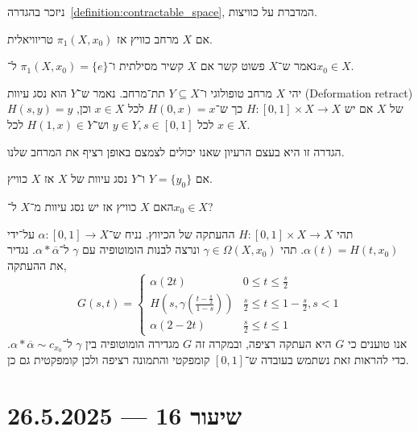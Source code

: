 ניזכר בהגדרה\ \ref{definition:contractable_space}, המדברת על כוויצות.
\begin{remark}
	אם $X$ מרחב כוויץ אז $\pi_1(X, x_0)$ טריוויאלית.
\end{remark}
\begin{definition}
	נאמר ש־$X$ פשוט קשר אם $X$ קשיר מסילתית ו־$\pi_1(X, x_0) = \{ e \}$ ל־$x_0 \in X$.
\end{definition}
\begin{definition}
	יהי $X$ מרחב טופולוגי ו־$Y \subseteq X$ תת־מרחב.
	נאמר ש־$Y$ הוא נסג עיוות (Deformation retract) של $X$ אם יש $H : [0, 1] \times X \to X$ כך ש־$H(0, x) = x$ לכל $x \in X$ וכן,
	$H(s, y) = y$ לכל $y \in Y, s \in [0, 1]$ וש־$H(1, x) \in Y$ לכל $x \in X$.
\end{definition}
הגדרה זו היא בעצם הרעיון שאנו יכולים לצמצם באופן רציף את המרחב שלנו.
\begin{example}
	אם $Y = \{ y_0 \}$ ו־$Y$ נסג עיוות של $X$ אז $X$ כוויץ.
\end{example}
\begin{exercise}
	האם $X$ כוויץ אז יש נסג עיוות מ־$X$ ל־$x_0 \in X$?
\end{exercise}
\begin{solution}
	תהי $H : [0, 1] \times X \to X$ ההעתקה של הכיווץ.
	נניח ש־$\alpha : [0, 1] \to X$ על־ידי $\alpha(t) = H(t, x_0)$.
	תהי $\gamma \in \Omega(X, x_0)$ ונרצה לבנות הומוטופיה עם $\gamma$ ל־$\alpha * \overline{\alpha}$.
	נגדיר את ההעתקה,
	\[
		G(s, t)
		= \begin{cases}
			\alpha(2t) & 0 \le t \le \frac{s}{2} \\
			H(s, \gamma(\frac{t - \frac{s}{2}}{1 - s})) & \frac{s}{2} \le t \le 1 - \frac{s}{2}, s < 1 \\
			\alpha(2 - 2t) & \frac{s}{2} \le t \le 1
		\end{cases}
	\]
	אנו טוענים כי $G$ היא העתקה רציפה, ובמקרה זה $G$ מגדירה הומוטופיה בין $\gamma$ ל־$\alpha * \overline{\alpha} \sim c_{x_0}$.
	כדי להראות זאת נשתמש בעובדה ש־$[0, 1]$ קומפקטי והתמונה רציפה ולכן קומפקטית גם כן.
\end{solution}

\section{שיעור 16 --- 26.5.2025}
